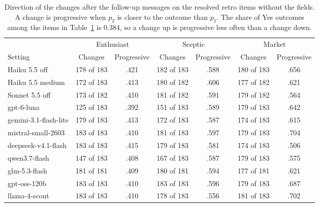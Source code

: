 \begin{table}[t]
\centering
\footnotesize
\setlength{\tabcolsep}{3pt}
\begin{adjustbox}{max width=\linewidth}
\begin{tabular}{lcccccc}
\toprule
& \multicolumn{2}{c}{Enthusiast} & \multicolumn{2}{c}{Sceptic} & \multicolumn{2}{c}{Market} \\
Setting & Changes & Progressive & Changes & Progressive & Changes & Progressive \\
\midrule
Haiku 5.5 off & 178 of 183 & .421 & 182 of 183 & .588 & 180 of 183 & .656 \\
Haiku 5.5 medium & 172 of 183 & .413 & 180 of 182 & .606 & 177 of 182 & .621 \\
Sonnet 5.5 off & 173 of 182 & .410 & 181 of 182 & .591 & 179 of 182 & .564 \\
gpt-6-luna & 125 of 183 & .392 & 151 of 183 & .589 & 179 of 183 & .642 \\
gemini-3.1-flash-lite & 179 of 183 & .413 & 172 of 183 & .587 & 174 of 183 & .615 \\
mistral-small-2603 & 183 of 183 & .410 & 181 of 183 & .597 & 179 of 183 & .704 \\
deepseek-v4.1-flash & 183 of 183 & .415 & 179 of 183 & .581 & 174 of 183 & .506 \\
qwen3.7-flash & 147 of 183 & .408 & 167 of 183 & .587 & 179 of 183 & .575 \\
glm-5.3-flash & 181 of 181 & .409 & 180 of 181 & .594 & 177 of 181 & .621 \\
gpt-oss-120b & 183 of 183 & .410 & 183 of 183 & .596 & 179 of 183 & .687 \\
llama-4-scout & 183 of 183 & .410 & 178 of 183 & .556 & 181 of 183 & .702 \\
\bottomrule
\end{tabular}
\end{adjustbox}
\caption{Direction of the changes after the follow-up messages on the resolved retro items without the fields. A change is progressive when $p_2$ is closer to the outcome than $p_1$. The share of Yes outcomes among the items in Table~\ref{tab:direction} is 0.384, so a change up is progressive less often than a change down.}
\label{tab:direction}
\end{table}
